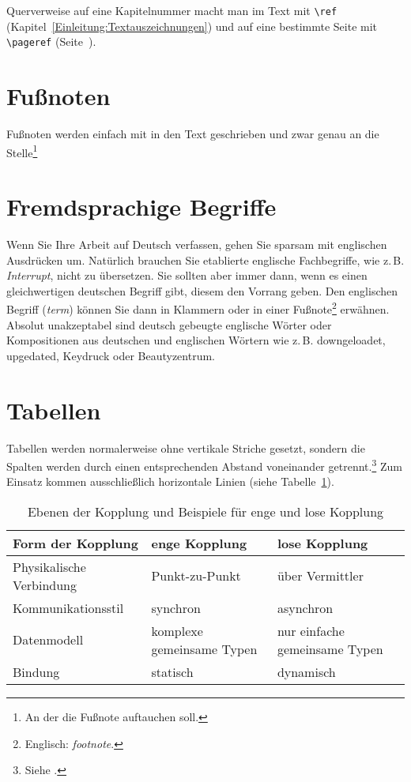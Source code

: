 Querverweise auf eine Kapitelnummer macht man im Text mit \verb+\ref+ (Kapitel~\ref{Einleitung:Textauszeichnungen}) und auf eine bestimmte Seite mit \verb+\pageref+ (Seite~\pageref{Einleitung:Textauszeichnungen}).


\section{Fußnoten}

Fußnoten werden einfach mit in den Text geschrieben und zwar genau an die Stelle\footnote{An der die Fußnote auftauchen soll.}



\section{Fremdsprachige Begriffe}

Wenn Sie Ihre Arbeit auf Deutsch verfassen, gehen Sie sparsam mit englischen Ausdrücken um. Natürlich brauchen Sie etablierte englische Fachbegriffe, wie z.\,B. \textit{Interrupt}, nicht zu übersetzen. Sie sollten aber immer dann, wenn es einen gleichwertigen deutschen Begriff gibt, diesem den Vorrang geben. Den englischen Begriff (\textit{term}) können Sie dann in Klammern oder in einer Fußnote\footnote{Englisch: \textit{footnote}.} erwähnen. Absolut unakzeptabel sind deutsch gebeugte englische Wörter oder Kompositionen aus deutschen und englischen Wörtern wie z.\,B. downgeloadet, upgedated, Keydruck oder Beautyzentrum.



\section{Tabellen}

Tabellen werden normalerweise ohne vertikale Striche gesetzt, sondern die Spalten werden durch einen entsprechenden Abstand voneinander getrennt.\footnote{Siehe \cite[S. 89]{Willberg1999}.} Zum Einsatz kommen ausschließlich horizontale Linien (siehe Tabelle~\ref{Kap2:Kopplungsformen}).

\begin{table}[h]
  \caption{Ebenen der Kopplung und Beispiele für enge und lose Kopplung}
  \label{Kap2:Kopplungsformen}
  \renewcommand{\arraystretch}{1.2}
  \centering
  \sffamily
  \begin{footnotesize}
    \begin{tabular}{l l l}
    \toprule
    \textbf{Form der Kopplung} & \textbf{enge Kopplung} & \textbf{lose Kopplung}\\
    \midrule
    Physikalische Verbindung	&	Punkt-zu-Punkt	& 	über Vermittler\\
    Kommunikationsstil	&	synchron		&	asynchron\\
    Datenmodell	&	komplexe gemeinsame Typen	&	nur einfache gemeinsame Typen\\
    Bindung	&	statisch		&	dynamisch\\
    \bottomrule
    \end{tabular}
  \end{footnotesize}
  \rmfamily
\end{table}

